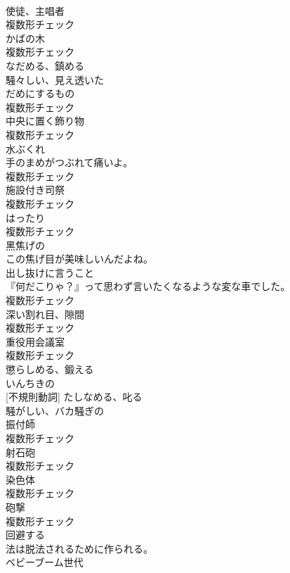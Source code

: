 \documentclass[8pt]{extreport}
\begin{document}
\begin{CJK}{UTF8}{min}
\\	[名詞]	使徒、主唱者	
\\	複数形チェック
\\	[名詞]	かばの木	
\\	複数形チェック
\\	[動詞]	なだめる、鎮める	
\\	[形容詞]	騒々しい、見え透いた	
\\	[名詞]	だめにするもの	
\\	複数形チェック
\\	[名詞]	中央に置く飾り物	
\\	複数形チェック
\\	[名詞]	水ぶくれ	
\\	手のまめがつぶれて痛いよ。	
\\	複数形チェック
\\	[名詞]	施設付き司祭	
\\	複数形チェック
\\	[名詞]	はったり	
\\	複数形チェック
\\	[形容詞]	黑焦げの	
\\	この焦げ目が美味しいんだよね。	
\\	[名詞]	出し抜けに言うこと	
\\	『何だこりゃ？』って思わず言いたくなるような変な車でした。	
\\	複数形チェック
\\	[名詞]	深い割れ目、隙間	
\\	複数形チェック
\\	[名詞]	重役用会議室	
\\	複数形チェック
\\	[動詞]	懲らしめる、鍛える	
\\	[形容詞]	いんちきの	
\\	[動詞] [不規則動詞]	たしなめる、叱る	
\\	[形容詞]	騒がしい、バカ騒ぎの	
\\	[名詞]	振付師	
\\	複数形チェック
\\	[名詞]	射石砲	
\\	複数形チェック
\\	[名詞]	染色体	
\\	複数形チェック
\\	[名詞]	砲撃	
\\	複数形チェック
\\	[動詞]	回避する	
\\	法は脱法されるために作られる。	
\\	[名詞]	ベビーブーム世代	

\end{CJK}
\end{document}
